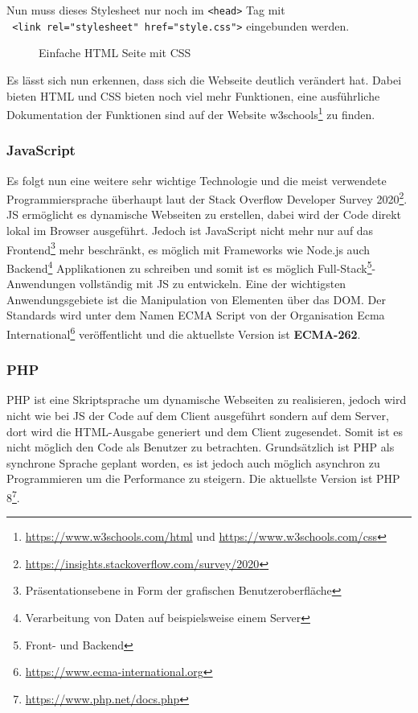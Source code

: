 Nun muss dieses Stylesheet nur noch im \verb|<head>| Tag mit\\
\texttt{  <link rel="stylesheet" href="style.css">} eingebunden werden.

\begin{figure}[H]
  \centering
  \caption{Einfache HTML Seite mit CSS}
\end{figure}

Es lässt sich nun erkennen, dass sich die Webseite deutlich verändert hat. Dabei
bieten HTML und CSS bieten noch viel mehr Funktionen, eine ausführliche
Dokumentation der Funktionen sind auf der Website
w3schools\footnote{\url{https://www.w3schools.com/html} und
\url{https://www.w3schools.com/css}} zu finden.

\subsubsection{JavaScript}
Es folgt nun eine weitere sehr wichtige Technologie und die meist verwendete
Programmiersprache überhaupt laut der Stack Overflow Developer Survey
2020\footnote{\url{https://insights.stackoverflow.com/survey/2020}}. \ac*{JS}
ermöglicht es dynamische Webseiten zu erstellen, dabei wird der Code direkt
lokal im Browser ausgeführt. Jedoch ist JavaScript nicht mehr nur auf das
Frontend\footnote{Präsentationsebene in Form der grafischen Benutzeroberfläche}
mehr beschränkt, es möglich mit Frameworks wie Node.js auch
Backend\footnote{Verarbeitung von Daten auf beispielsweise einem Server}
Applikationen zu schreiben und somit ist es möglich Full-Stack\footnote{Front-
und Backend}-Anwendungen vollständig mit \acl*{JS} zu entwickeln. Eine der
wichtigsten Anwendungsgebiete ist die Manipulation von Elementen über das
\ac*{DOM}. Der Standards wird unter dem Namen ECMA Script von der Organisation
Ecma International\footnote{\url{https://www.ecma-international.org}}
veröffentlicht und die aktuellste Version ist \textbf{ECMA-262}.

\subsubsection{PHP}
\ac*{PHP} ist eine Skriptsprache um dynamische Webseiten zu realisieren, jedoch
wird nicht wie bei \acl*{JS} der Code auf dem Client ausgeführt sondern auf dem
Server, dort wird die HTML-Ausgabe generiert und dem Client zugesendet. Somit
ist es nicht möglich den Code als Benutzer zu betrachten. Grundsätzlich ist PHP
als synchrone Sprache geplant worden, es ist jedoch auch möglich asynchron zu
Programmieren um die Performance zu steigern. Die aktuellste Version ist
\acs*{PHP} 8\footnote{\url{https://www.php.net/docs.php}}.


